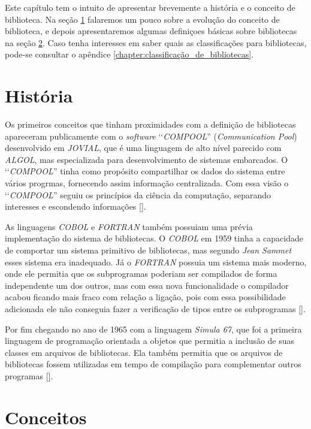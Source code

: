 Este capítulo tem o intuito de apresentar brevemente a história e o conceito de biblioteca. Na seção
\ref{section:historia_biblioteca} falaremos um pouco sobre a evolução do conceito de biblioteca, e
depois apresentaremos algumas definiçoes básicas sobre bibliotecas na seção \ref{section:conceitos}.
Caso tenha interesses em saber quais as classificações para bibliotecas, pode-se consultar o
apêndice \ref{chapter:classificação_de_bibliotecas}.

\section{História}
\label{section:historia_biblioteca}

Os primeiros conceitos que tinham proximidades com a definição de bibliotecas apareceram publicamente
com o \emph{software} ‘‘\emph{COMPOOL}'' (\emph{Communication Pool}) desenvolvido em \emph{JOVIAL},
que é uma linguagem de alto nível parecido com \emph{ALGOL}, mas especializada para desenvolvimento
de sistemas embarcados. O ‘‘\emph{COMPOOL}'' tinha como propósito compartilhar os dados do
sistema entre vários progrmas, fornecendo assim informação centralizada. Com essa visão o
‘‘\emph{COMPOOL}'' seguiu os princípios da ciência da computação, separando interesses e
escondendo informações [].

As linguagens \emph{COBOL} e \emph{FORTRAN} também possuiam uma prévia implementação do sistema de
bibliotecas. O \emph{COBOL} em 1959 tinha a capacidade de comportar um sistema primitivo de
bibliotecas, mas segundo \emph{Jean Sammet} esses sistema era inadequado. Já o
\emph{FORTRAN} possuia um sistema mais moderno, onde ele permitia que os subprogramas poderiam ser
compilados de forma independente um dos outros, mas com essa nova funcionalidade o compilador acabou
ficando mais fraco com relação a ligação, pois com essa possibilidade adicionada ele não conseguia
fazer a verificação de tipos entre os subprogramas [].

Por fim chegando no ano de 1965 com a linguagem \emph{Simula 67}, que foi a primeira linguagem
de programação orientada a objetos que permitia a inclusão de suas classes em arquivos de bibliotecas.
Ela também permitia que os arquivos de bibliotecas fossem utilizadas em tempo de compilação para
complementar outros programas [].

\section{Conceitos}
\label{section:conceitos}


